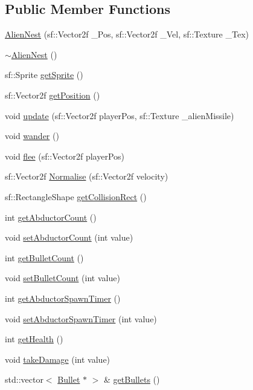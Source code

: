 \subsection*{Public Member Functions}
\begin{DoxyCompactItemize}
\item 
\hyperlink{class_alien_nest_ae5468acc196e21772de57cc786bc8922}{Alien\+Nest} (sf\+::\+Vector2f \+\_\+\+Pos, sf\+::\+Vector2f \+\_\+\+Vel, sf\+::\+Texture \+\_\+\+Tex)
\item 
\hyperlink{class_alien_nest_adf76d39d4b159b48b685e28b48e65af4}{$\sim$\+Alien\+Nest} ()
\item 
sf\+::\+Sprite \hyperlink{class_alien_nest_ab37d12dc080c9433d0b34324160c4540}{get\+Sprite} ()
\item 
sf\+::\+Vector2f \hyperlink{class_alien_nest_a1d0491e4d757b1f068fcdfdff3af4263}{get\+Position} ()
\item 
void \hyperlink{class_alien_nest_a4dc29eea96da989af765ac1c0b92cbe0}{update} (sf\+::\+Vector2f player\+Pos, sf\+::\+Texture \+\_\+alien\+Missile)
\item 
void \hyperlink{class_alien_nest_ac2679698409238879ace3367ceba6d9d}{wander} ()
\item 
void \hyperlink{class_alien_nest_a79b79e01b2c2c191a62f6522e62e7093}{flee} (sf\+::\+Vector2f player\+Pos)
\item 
sf\+::\+Vector2f \hyperlink{class_alien_nest_a1482a4dc78827c14dd442a8d9a0a36e3}{Normalise} (sf\+::\+Vector2f velocity)
\item 
sf\+::\+Rectangle\+Shape \hyperlink{class_alien_nest_a7522ad4ae88e2471de29ab62451ec36a}{get\+Collision\+Rect} ()
\item 
int \hyperlink{class_alien_nest_ac5004adc73493a1f3f0807cd03b522c8}{get\+Abductor\+Count} ()
\item 
void \hyperlink{class_alien_nest_a0b47d6d12801e07c6d59592d37444c81}{set\+Abductor\+Count} (int value)
\item 
int \hyperlink{class_alien_nest_a076132ab9da2dae0b0a4eb66b7dc41b8}{get\+Bullet\+Count} ()
\item 
void \hyperlink{class_alien_nest_a050a64974389f5f6d4fbd1c74aa30bb5}{set\+Bullet\+Count} (int value)
\item 
int \hyperlink{class_alien_nest_ad8eb2e360b956e44ec9da1d0da42cf88}{get\+Abductor\+Spawn\+Timer} ()
\item 
void \hyperlink{class_alien_nest_ac19100b42e3fda84431a918517411573}{set\+Abductor\+Spawn\+Timer} (int value)
\item 
int \hyperlink{class_alien_nest_adca5cfd4eae3e3f72dd76960a29588e9}{get\+Health} ()
\item 
void \hyperlink{class_alien_nest_a49b484cdb9ba5c49e1d2912f359b66c5}{take\+Damage} (int value)
\item 
std\+::vector$<$ \hyperlink{class_bullet}{Bullet} $\ast$ $>$ \& \hyperlink{class_alien_nest_a06b510eab5f7bb869078662f42080738}{get\+Bullets} ()
\end{DoxyCompactItemize}


